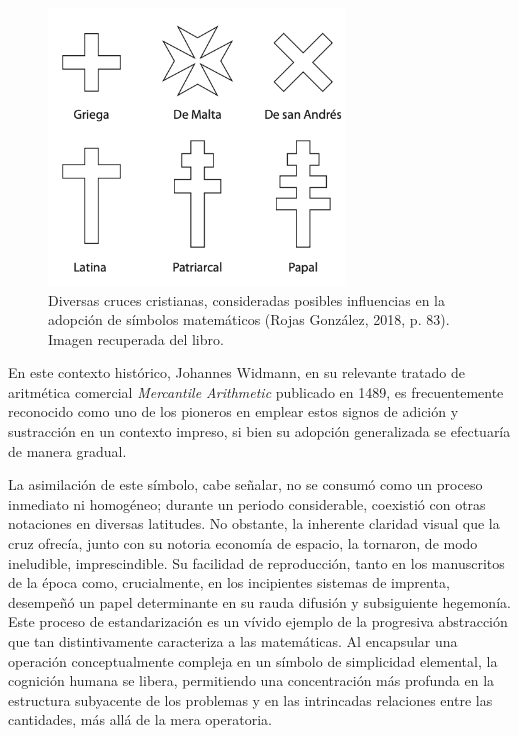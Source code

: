 \documentclass[11pt, a4paper]{article}
\begin{document}
\begin{figure}[H]
    \centering
    \includegraphics[width=0.7\textwidth]{Diversas cruces cristianas, inspiracion para simbolos matematicos..png}
    \caption{Diversas cruces cristianas, consideradas posibles influencias en la adopción de símbolos matemáticos (Rojas González, 2018, p. 83). Imagen recuperada del libro.}
    \label{fig:cruces}
\end{figure}

En este contexto histórico, Johannes Widmann, en su relevante tratado de aritmética comercial \textit{Mercantile Arithmetic} publicado en 1489, es frecuentemente reconocido como uno de los pioneros en emplear estos signos de adición y sustracción en un contexto impreso, si bien su adopción generalizada se efectuaría de manera gradual.

La asimilación de este símbolo, cabe señalar, no se consumó como un proceso inmediato ni homogéneo; durante un periodo considerable, coexistió con otras notaciones en diversas latitudes. No obstante, la inherente claridad visual que la cruz ofrecía, junto con su notoria economía de espacio, la tornaron, de modo ineludible, imprescindible. Su facilidad de reproducción, tanto en los manuscritos de la época como, crucialmente, en los incipientes sistemas de imprenta, desempeñó un papel determinante en su rauda difusión y subsiguiente hegemonía. Este proceso de estandarización es un vívido ejemplo de la progresiva abstracción que tan distintivamente caracteriza a las matemáticas. Al encapsular una operación conceptualmente compleja en un símbolo de simplicidad elemental, la cognición humana se libera, permitiendo una concentración más profunda en la estructura subyacente de los problemas y en las intrincadas relaciones entre las cantidades, más allá de la mera operatoria.
\end{document}
